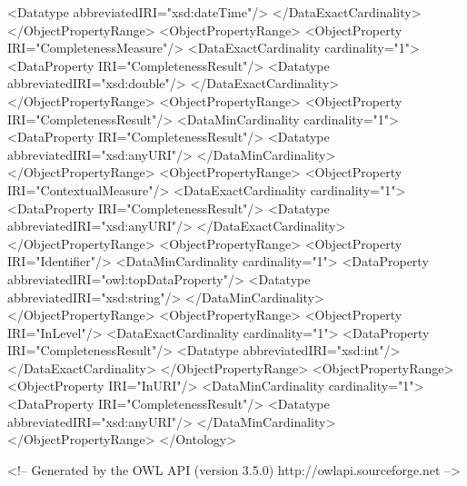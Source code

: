 \begin{listing}
            <Datatype abbreviatedIRI="xsd:dateTime"/>
        </DataExactCardinality>
    </ObjectPropertyRange>
    <ObjectPropertyRange>
        <ObjectProperty IRI="CompletenessMeasure"/>
        <DataExactCardinality cardinality="1">
            <DataProperty IRI="CompletenessResult"/>
            <Datatype abbreviatedIRI="xsd:double"/>
        </DataExactCardinality>
    </ObjectPropertyRange>
    <ObjectPropertyRange>
        <ObjectProperty IRI="CompletenessResult"/>
        <DataMinCardinality cardinality="1">
            <DataProperty IRI="CompletenessResult"/>
            <Datatype abbreviatedIRI="xsd:anyURI"/>
        </DataMinCardinality>
    </ObjectPropertyRange>
    <ObjectPropertyRange>
        <ObjectProperty IRI="ContextualMeasure"/>
        <DataExactCardinality cardinality="1">
            <DataProperty IRI="CompletenessResult"/>
            <Datatype abbreviatedIRI="xsd:anyURI"/>
        </DataExactCardinality>
    </ObjectPropertyRange>
    <ObjectPropertyRange>
        <ObjectProperty IRI="Identifier"/>
        <DataMinCardinality cardinality="1">
            <DataProperty abbreviatedIRI="owl:topDataProperty"/>
            <Datatype abbreviatedIRI="xsd:string"/>
        </DataMinCardinality>
    </ObjectPropertyRange>
    <ObjectPropertyRange>
        <ObjectProperty IRI="InLevel"/>
        <DataExactCardinality cardinality="1">
            <DataProperty IRI="CompletenessResult"/>
            <Datatype abbreviatedIRI="xsd:int"/>
        </DataExactCardinality>
    </ObjectPropertyRange>
    <ObjectPropertyRange>
        <ObjectProperty IRI="InURI"/>
        <DataMinCardinality cardinality="1">
            <DataProperty IRI="CompletenessResult"/>
            <Datatype abbreviatedIRI="xsd:anyURI"/>
        </DataMinCardinality>
    </ObjectPropertyRange>
</Ontology>



<!-- Generated by the OWL API (version 3.5.0) http://owlapi.sourceforge.net -->



\end{listing}
